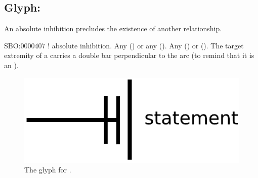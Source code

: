 \color{green}

\subsection{Glyph: }\label{sec:absoluteInhibition}

An absolute inhibition precludes the existence of another relationship.

\begin{glyphDescription}
 \glyphSboTerm SBO:0000407 ! absolute inhibition.
 \glyphOrigin Any  () or any  ().
 \glyphTarget Any  () or  ().
 \glyphEndPoint The target extremity of a  carries a double bar perpendicular to the arc (to remind that it is an ).
 \end{glyphDescription}

\begin{figure}[H]
  \centering
  \includegraphics[scale = 0.5]{images/absoluteInhibition}
  \caption{The \PD glyph for .}
  \label{fig:absoluteInhibition}
\end{figure}
%
%
%
%
%
%
%

